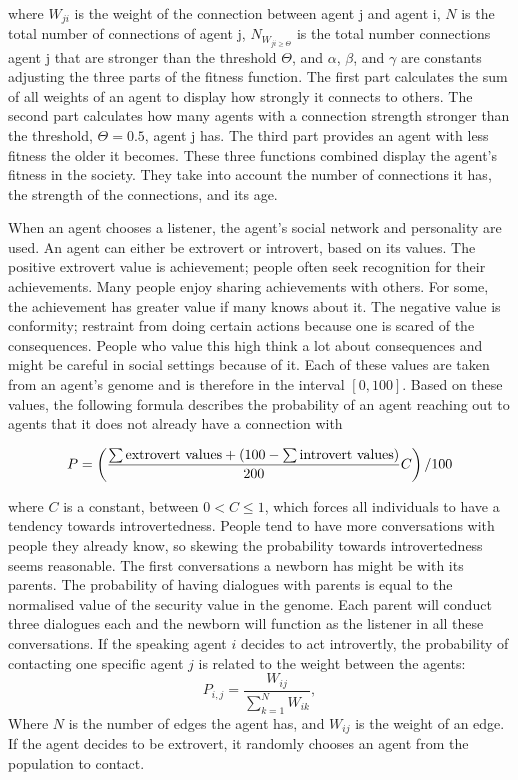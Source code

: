 where $W_{ji}$ is the weight of the connection between agent j and agent i, $N$ is the total number of connections of agent j, $ N_{W_{ji \geq \Theta}}$ is the total number connections agent j that are stronger than the threshold $\Theta$, and $\alpha$, $\beta$, and $\gamma$ are constants adjusting the three parts of the fitness function. The first part calculates the sum of all weights of an agent to display how strongly it connects to others. The second part calculates how many agents with a connection strength stronger than the threshold, $\Theta = 0.5$, agent j has. The third part provides an agent with less fitness the older it becomes. These three functions combined display the agent’s fitness in the society. They take into account the number of connections it has, the strength of the connections, and its age.

When an agent chooses a listener, the agent's social network and personality are used. An agent can either be extrovert or introvert, based on its values. The positive extrovert value is achievement; people often seek recognition for their achievements. Many people enjoy sharing achievements with others. For some, the achievement has greater value if many knows about it. The negative value is conformity; restraint from doing certain actions because one is scared of the consequences. People who value this high think a lot about consequences and might be careful in social settings because of it. Each of these values are taken from an agent’s genome and is therefore in the interval $[0, 100]$. Based on these values, the following formula describes the probability of an agent reaching out to agents that it does not already have a connection with

\begin{equation}\label{eq:chooseListener}
P = \left( \frac{\sum \text{extrovert values} + (100 - \sum \text{introvert values})}{200}C \right)/100
\end{equation}

where $C$ is a constant, between $0 < C \leq 1$, which forces all individuals to have a tendency towards introvertedness. People tend to have more conversations with people they already know, so skewing the probability towards introvertedness seems reasonable. The first conversations a newborn has might be with its parents. The probability of having dialogues with parents is equal to the normalised value of the security value in the genome. Each parent will conduct three dialogues each and the newborn will function as the listener in all these conversations. If the speaking agent $i$ decides to act introvertly, the probability of contacting one specific agent $j$ is related to the weight between the agents:
\begin{equation}\label{eq:intrvertListener}
P_{i,j} = \frac{W_{ij}}{\sum_{k=1}^{N}{W_{ik}}},
\end{equation}
Where $N$ is the number of edges the agent has, and $W_{ij}$ is the weight of an edge. If the agent decides to be extrovert, it randomly chooses an agent from the population to contact.

